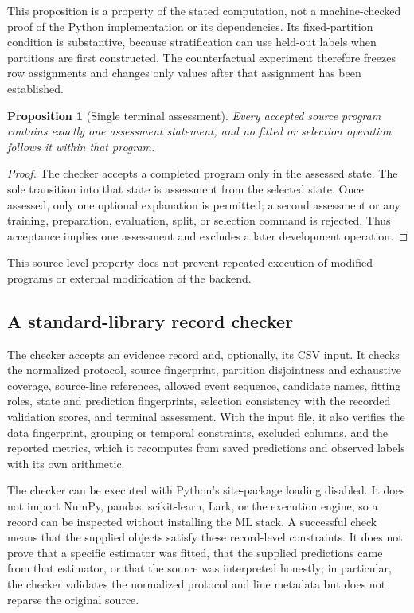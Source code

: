 \documentclass[lettersize,journal]{IEEEtran}
\newtheorem{proposition}{Proposition}
\begin{document}
This proposition is a property of the stated computation, not a machine-checked proof of the Python implementation or its dependencies. Its fixed-partition condition is substantive, because stratification can use held-out labels when partitions are first constructed. The counterfactual experiment therefore freezes row assignments and changes only values after that assignment has been established.

\begin{proposition}[Single terminal assessment]\label{prop:terminal}
Every accepted source program contains exactly one assessment statement, and no fitted or selection operation follows it within that program.
\end{proposition}
\begin{proof}
The checker accepts a completed program only in the assessed state. The sole transition into that state is assessment from the selected state. Once assessed, only one optional explanation is permitted; a second assessment or any training, preparation, evaluation, split, or selection command is rejected. Thus acceptance implies one assessment and excludes a later development operation.
\end{proof}

This source-level property does not prevent repeated execution of modified programs or external modification of the backend.

\subsection{A standard-library record checker}
The checker accepts an evidence record and, optionally, its CSV input. It checks the normalized protocol, source fingerprint, partition disjointness and exhaustive coverage, source-line references, allowed event sequence, candidate names, fitting roles, state and prediction fingerprints, selection consistency with the recorded validation scores, and terminal assessment. With the input file, it also verifies the data fingerprint, grouping or temporal constraints, excluded columns, and the reported metrics, which it recomputes from saved predictions and observed labels with its own arithmetic.

The checker can be executed with Python's site-package loading disabled. It does not import NumPy, pandas, scikit-learn, Lark, or the execution engine, so a record can be inspected without installing the ML stack. A successful check means that the supplied objects satisfy these record-level constraints. It does not prove that a specific estimator was fitted, that the supplied predictions came from that estimator, or that the source was interpreted honestly; in particular, the checker validates the normalized protocol and line metadata but does not reparse the original source.
\end{document}
